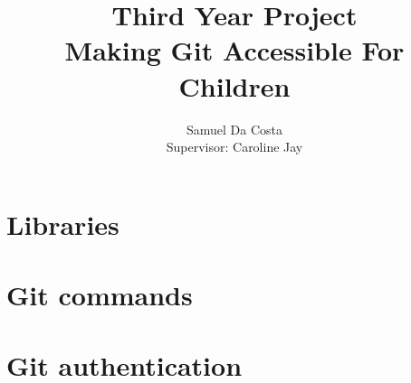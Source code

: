 \documentclass[a4paper]{report}
\begin{document}
\newcommand{\fig}[4]{

\begin{figure} 
    \centering
    \texttt{[image: \#1]}
    \caption{#2}
    \label{#3}
\end{figure}


}
\title{Third Year Project \\
\large Making Git Accessible For Children \\
}
\author{Samuel Da Costa\\
Supervisor: Caroline Jay}
\maketitle
\tableofcontents

\begin{abstract}

\end{abstract}







\begin{appendices}

\chapter{Libraries}\label{appendix_libraries}



\chapter{Git commands}\label{appendix_plumbing}



\chapter{Git authentication}\label{appendix_gitauth}




\end{appendices}



\end{document}
